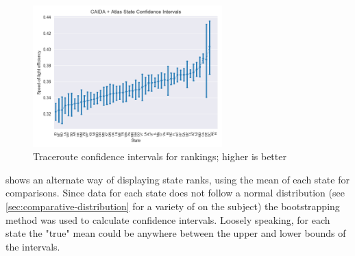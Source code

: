 \begin{figure}[htb]
    \centering
    \includegraphics[width=0.65\textwidth]{images/comparative/confidence_intervals/caida_confidence_interval.png}
    \caption{Traceroute confidence intervals for rankings; higher is better}
    \label{fig:caida_confidence_intervals}
\end{figure}

 shows an alternate way of displaying state ranks, using the mean of each state for comparisons. Since data for each state does not follow a normal distribution (see \cref{sec:comparative-distribution} for a variety of \kdes on the subject) the bootstrapping method was used to calculate confidence intervals. Loosely speaking, for each state the "true" mean could be anywhere between the upper and lower bounds of the intervals.
